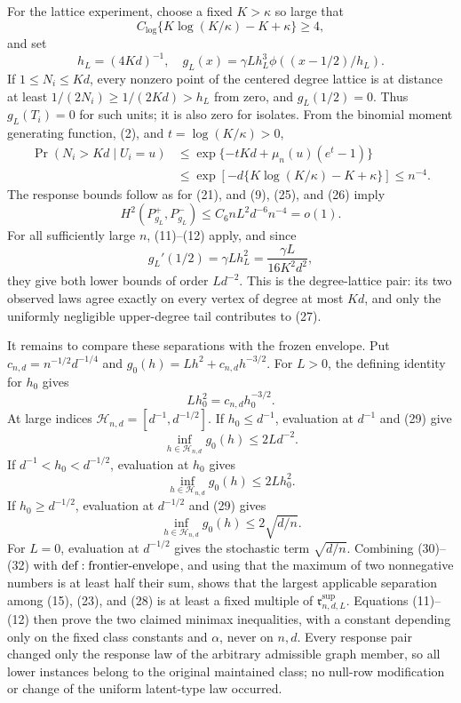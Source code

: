 For the lattice experiment, choose a fixed \(K>\kappa\) so large that
\[
 C_{\log}\{K\log(K/\kappa)-K+\kappa\}\geq4,
\tag{24}
\]
and set
\[
 h_L=(4Kd)^{-1},\quad
 g_L(x)=\gamma Lh_L^3\phi((x-1/2)/h_L).
\tag{25}
\]
If \(1\leq N_i\leq Kd\), every nonzero point of the centered degree lattice is at distance at least \(1/(2N_i)\geq1/(2Kd)>h_L\) from zero, and \(g_L(1/2)=0\).  Thus \(g_L(T_i)=0\) for such units; it is also zero for isolates.  From the binomial moment generating function, (2), and \(t=\log(K/\kappa)>0\),
\[
\begin{aligned}
 \Pr(N_i>Kd\mid U_i=u)
 &\leq\exp\{-tKd+\mu_n(u)(e^t-1)\}\\
 &\leq\exp[-d\{K\log(K/\kappa)-K+\kappa\}]
 \leq n^{-4}.
\end{aligned}
\tag{26}
\]
The response bounds follow as for (21), and (9), (25), and (26) imply
\[
 H^2(P_{g_L}^+,P_{g_L}^-)
 \leq C_6nL^2d^{-6}n^{-4}=o(1).
\tag{27}
\]
For all sufficiently large \(n\), (11)--(12) apply, and since
\[
 g_L'(1/2)=\gamma Lh_L^2=\frac{\gamma L}{16K^2d^2},
\tag{28}
\]
they give both lower bounds of order \(Ld^{-2}\).  This is the degree-lattice pair: its two observed laws agree exactly on every vertex of degree at most \(Kd\), and only the uniformly negligible upper-degree tail contributes to (27).

It remains to compare these separations with the frozen envelope.  Put \(c_{n,d}=n^{-1/2}d^{-1/4}\) and \(g_0(h)=Lh^2+c_{n,d}h^{-3/2}\).  For \(L>0\), the defining identity for \(h_0\) gives
\[
 Lh_0^2=c_{n,d}h_0^{-3/2}.
\tag{29}
\]
At large indices \(\mathcal H_{n,d}=[d^{-1},d^{-1/2}]\).  If \(h_0\leq d^{-1}\), evaluation at \(d^{-1}\) and (29) give
\[
 \inf_{h\in\mathcal H_{n,d}}g_0(h)\leq2Ld^{-2}.
\tag{30}
\]
If \(d^{-1}<h_0<d^{-1/2}\), evaluation at \(h_0\) gives
\[
 \inf_{h\in\mathcal H_{n,d}}g_0(h)\leq2Lh_0^2.
\tag{31}
\]
If \(h_0\geq d^{-1/2}\), evaluation at \(d^{-1/2}\) and (29) gives
\[
 \inf_{h\in\mathcal H_{n,d}}g_0(h)\leq2\sqrt{d/n}.
\tag{32}
\]
For \(L=0\), evaluation at \(d^{-1/2}\) gives the stochastic term \(\sqrt{d/n}\).  Combining (30)--(32) with \({\rm def:frontier\text{-}envelope}\), and using that the maximum of two nonnegative numbers is at least half their sum, shows that the largest applicable separation among (15), (23), and (28) is at least a fixed multiple of \(\mathfrak r^{\mathrm{sup}}_{n,d,L}\).  Equations (11)--(12) then prove the two claimed minimax inequalities, with a constant depending only on the fixed class constants and \(\alpha\), never on \(n,d\).  Every response pair changed only the response law of the arbitrary admissible graph member, so all lower instances belong to the original maintained class; no null-row modification or change of the uniform latent-type law occurred.